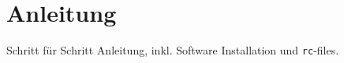 \section{Anleitung}%
\label{sec:anleitung}

Schritt für Schritt Anleitung, inkl. Software Installation und
\texttt{rc}-files.

